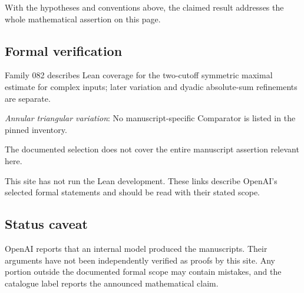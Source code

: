 \documentclass[11pt]{article}
\begin{document}
With the hypotheses and conventions above, the claimed result addresses the whole mathematical assertion on this page.

\subsection{Formal verification}
Family 082 describes Lean coverage for the two-cutoff symmetric maximal estimate for complex inputs; later variation and dyadic absolute-sum refinements are separate.

\textit{Annular triangular variation}: No manuscript-specific Comparator is listed in the pinned inventory.

The documented selection does not cover the entire manuscript assertion relevant here.

This site has not run the Lean development. These links describe OpenAI’s selected formal statements and should be read with their stated scope.

\subsection{Status caveat}
OpenAI reports that an internal model produced the manuscripts. Their arguments have not been independently verified as proofs by this site. Any portion outside the documented formal scope may contain mistakes, and the catalogue label reports the announced mathematical claim.
\end{document}
